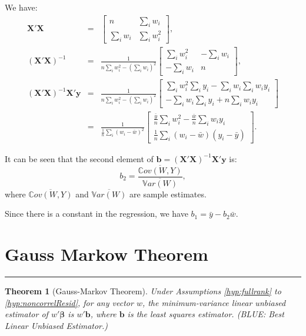 \documentclass[
]{book}
\newtheorem{theorem}{Theorem}[chapter]
\theoremstyle{definition}
\theoremstyle{definition}
\theoremstyle{definition}
\theoremstyle{definition}
\theoremstyle{remark}
\begin{document}
We have:
\begin{eqnarray*}
\mathbf{X}'\mathbf{X} &=& 
\left[\begin{array}{cc}
n & \sum_i w_i \\
\sum_i w_i & \sum_i w_i^2
\end{array}
\right],\\
(\mathbf{X}'\mathbf{X})^{-1} &=& 
\frac{1}{n\sum_i w_i^2-(\sum_i w_i)^2}
\left[\begin{array}{cc}
\sum_i w_i^2 & -\sum_i w_i \\
-\sum_i w_i & n
\end{array}
\right],\\
(\mathbf{X}'\mathbf{X})^{-1}\mathbf{X}'\mathbf{y} &=& 
\frac{1}{n\sum_i w_i^2-(\sum_i w_i)^2}
\left[\begin{array}{c}
\sum_i w_i^2\sum_i y_i -\sum_i w_i \sum_i w_iy_i \\
-\sum_i w_i \sum_i y_i + n \sum_i w_i y_i
\end{array}
\right]\\
&=& \frac{1}{\frac{1}{n}\sum_i(w_i - \bar{w})^2}
\left[\begin{array}{c}
\frac{\bar{y}}{n}\sum_i w_i^2 -\frac{\bar{w}}{n}\sum_i w_iy_i \\
\frac{1}{n}\sum_i (w_i-\bar{w})(y_i-\bar{y})
\end{array}
\right].
\end{eqnarray*}

It can be seen that the second element of \(\mathbf{b}=(\mathbf{X}'\mathbf{X})^{-1}\mathbf{X}'\mathbf{y}\) is:
\[
b_2 = \frac{\overline{\mathbb{C}ov(W,Y)}}{\overline{\mathbb{V}ar(W)}},
\]
where \(\overline{\mathbb{C}ov(W,Y)}\) and \(\overline{\mathbb{V}ar(W)}\) are sample estimates.

Since there is a constant in the regression, we have \(b_1 = \bar{y} - b_2 \bar{w}\).

\hypertarget{gauss-markow-theorem}{%
\section{Gauss Markow Theorem}\label{gauss-markow-theorem}}

\begin{center}\rule{0.5\linewidth}{0.5pt}\end{center}

\begin{theorem}[Gauss-Markov Theorem]
\protect\hypertarget{thm:GaussMarkov}{}\label{thm:GaussMarkov}Under Assumptions \ref{hyp:fullrank} to \ref{hyp:noncorrelResid}, for any vector \(w\), the minimum-variance linear unbiased estimator of \(w' \boldsymbol\beta\) is \(w' \mathbf{b}\), where \(\mathbf{b}\) is the least squares estimator. (BLUE: Best Linear Unbiased Estimator.)
\end{theorem}
\end{document}
